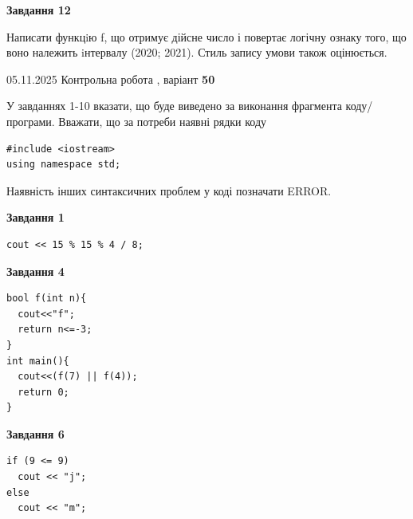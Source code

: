 \documentclass[12pt, ukrainian]{article}
\begin{document}
{\begin {large}
\begin{minipage}[t]{11.0cm}
\begin{center}
\textbf{Завдання 12}
\end{center}

Написати функцiю f, що отримує дійсне число і повертає логічну ознаку того, що воно належить iнтервалу (2020; 2021). Стиль запису умови також оцінюється.\par

\end{minipage}

\end {large}}
\newpage

{\Large{05.11.2025 Контрольна робота , варіант  \No \textbf { 50 }\par}}
{
\begin {large}
У завданнях 1-10 вказати, що буде виведено за виконання фрагмента коду/про\-гра\-ми.
Вважати, що за потреби наявні рядки коду
\begin{verbatim}
#include <iostream>
using namespace std;
\end{verbatim}
Наявність інших синтаксичних проблем у коді позначати ERROR.

\begin{minipage}[t]{7.0cm}

\begin{center}
\textbf{Завдання 1}
\end{center}
\vspace{-8mm}

\begin{verbatim}
cout << 15 % 15 % 4 / 8;
\end{verbatim}



\begin{center}
\textbf{Завдання 4}
\end{center}
\vspace{-8mm}

\begin{verbatim}
bool f(int n){
  cout<<"f";
  return n<=-3;
}
int main(){
  cout<<(f(7) || f(4));
  return 0;
}
\end{verbatim}



\begin{center}
\textbf{Завдання 6}
\end{center}
\vspace{-8mm}

\begin{verbatim}
if (9 <= 9)
  cout << "j";
else
  cout << "m";
\end{verbatim}




\end{minipage}
\end{large}}
\end{document}
